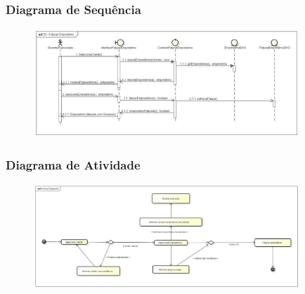 \documentclass{beamer}
\begin{document}
\begin{frame}

\frametitle{Diagrama de Sequência}
\begin{figure}[!ht]
\centering
\includegraphics[width=10cm]{ds-fatura-emprestimo-henrique.png}

\end{figure}

\end{frame}
\begin{frame}

\frametitle{Diagrama de Atividade}
\begin{figure}[!ht]
\centering
\includegraphics[width=10cm]{da-fatura-emprestimo-henrique.png}

\end{figure}

\end{frame}
\end{document}
